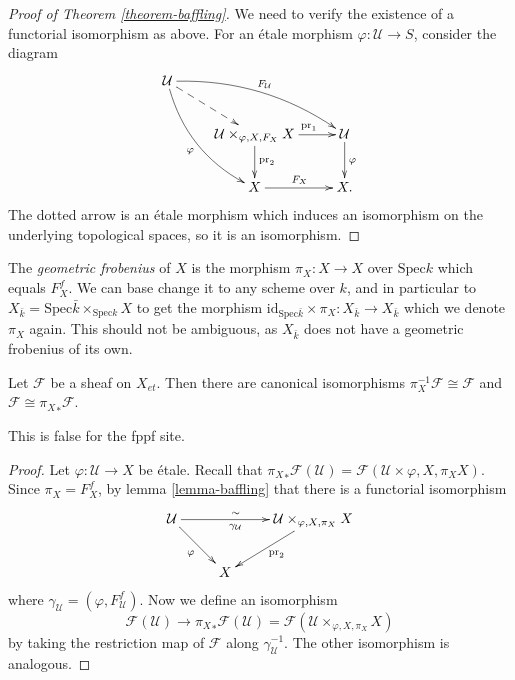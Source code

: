 \begin{proof}[Proof of Theorem \ref{theorem-baffling}]
We need to verify the existence of a functorial isomorphism as above. For an
\'etale morphism $\varphi: \mathcal{U} \to S$, consider the diagram
$$
\xymatrix{
\mathcal{U} \ar@{-->}[rd] \ar^{F_\mathcal{U}}@/^1pc/[rrd]
\ar_{\varphi}@/_1pc/[rdd] \\
& {\mathcal{U} \times_{\varphi, X,F_X} X} \ar^{\qquad \text{pr}_1 \ \ }[r]
\ar^{\text{pr}_2}[d] & \mathcal{U} \ar^{\varphi}[d] \\
& X \ar^{F_X}[r] & X.
}
$$
The dotted arrow is an \'etale morphism which induces an isomorphism on the
underlying topological spaces, so it is an isomorphism.
\end{proof}


\begin{definition}
\label{definition-geometric-frobenius}
The {\it geometric frobenius} of $X$ is the morphism $\pi_X : X \to X$ over
$\text{Spec} k$ which equals $F_X^f$. We can base change it to any scheme over
$k$, and in particular to $X_{\bar k} = \text{Spec} \bar k \times_{\text{Spec}
k} X$ to get the morphism $\text{id}_{\text{Spec} \bar k } \times \pi_X :
X_{\bar k} \to X_{\bar k}$ which we denote $\pi_X$ again. This should not be
ambiguous, as $X_{\bar k}$ does not have a geometric frobenius of its own.
\end{definition}

\begin{lemma}
\label{lemma-sheaf-over-finite-field-has-frobenius-descent}
Let $\mathcal{F}$ be a sheaf on $X_{et}$.
Then there are canonical isomorphisms
$\pi_X^{-1} \mathcal{F} \cong \mathcal{F}$ and
$\mathcal{F} \cong {\pi_X}_*\mathcal{F}$.
\end{lemma}

\noindent
This is false for the fppf site.

\begin{proof}
Let $\varphi: \mathcal{U} \to X$ be \'etale. Recall that ${\pi_X}_* \mathcal{F}
(\mathcal{U}) = \mathcal{F} (\mathcal{U} \times{\varphi, X, \pi_X} X)$. Since
$\pi_X = F_X^f$, by lemma \ref{lemma-baffling} that there is a
functorial isomorphism
$$
\xymatrix{
\mathcal{U} \ar_{\varphi}[rd] \ar^{\sim \quad}_{\gamma_\mathcal{U} \quad}[rr]
&& {\mathcal{U} \times_{\varphi, X, \pi_X} X} \ar^{\text{pr}_2}[ld]\\
& X
}
$$
where $\gamma_\mathcal{U} = (\varphi, F_\mathcal{U}^f)$. Now we define an
isomorphism
$$
\mathcal{F} (\mathcal{U}) \longrightarrow {\pi_X}_* \mathcal{F} (\mathcal{U}) =
\mathcal{F} (\mathcal{U} \times_{\varphi, X, \pi_X} X)
$$
by taking the restriction map of $\mathcal{F}$ along $\gamma_\mathcal{U}^{-1}$.
The other isomorphism is analogous.
\end{proof}

